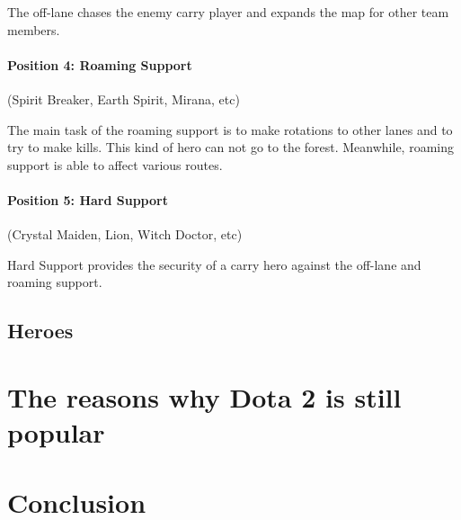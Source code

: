 \documentclass[12pt,twoside,english,a4paper]{article}
\begin{document}
The off-lane chases the enemy carry player and expands the map for other team members.
\paragraph{Position 4: Roaming Support}(Spirit Breaker, Earth Spirit, Mirana, etc)

The main task of the roaming support is to make rotations to other lanes and to try to make kills. This kind of hero can not go to the forest. Meanwhile, roaming support is able to affect various routes.
\paragraph{Position 5: Hard Support} (Crystal Maiden, Lion, Witch Doctor, etc)

Hard Support provides the security of a carry hero against the off-lane and roaming support.

\subsection{Heroes} \label{heroes}


\section{The reasons why Dota 2 is still popular} \label{the reasons why Dota 2 is still popular}

\section{Conclusion} \label{conclusion} %






\end{document}
